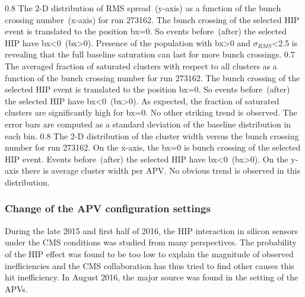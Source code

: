                  {0.8}       %
                 {The 2-D distribution of RMS spread~(y-axis) as a function of the bunch crossing number~(x-axis) for run 273162. The bunch crossing of the selected HIP event is translated to the position bx=0. So events before~(after) the selected HIP have bx<0~(bx>0). Presence of the population with bx>0 and $\sigma_{RMS}$<2.5 is revealing that the full baseline saturation can last for more bunch crossings. } %
                 {0.7}       %
                 {The averaged fraction of saturated clusters with respect to all clusters as a function of the bunch crossing  number for run 273162. The bunch crossing of the selected HIP event is translated to the position bx=0. So events before~(after) the selected HIP have bx<0~(bx>0). As expected, the fraction of saturated clusters are significantly high for bx=0. No other striking trend is observed. The error bars are computed as a standard deviation of the baseline distribution in each bin. } %
                 {0.8}       %
                 {The 2-D distribution of the cluster width versus the bunch crossing number for run 273162. On the x-axis, the bx=0 is bunch crossing of the selected HIP event. Events before~(after) the selected HIP have bx<0~(bx>0). On the y-axis there is average cluster width per APV. No obvious trend is observed in this distribution. } %


\subsubsection{Change of the APV configuration settings}

During the late 2015 and first half of 2016, the HIP interaction in silicon sensors under the CMS conditions was studied from many perspectives. The probability of the HIP effect was found to be too low to explain the magnitude of observed inefficiencies and the CMS collaboration has thus tried to find other causes this hit inefficiency. In August 2016, the major source was found in the setting of the APVs.

